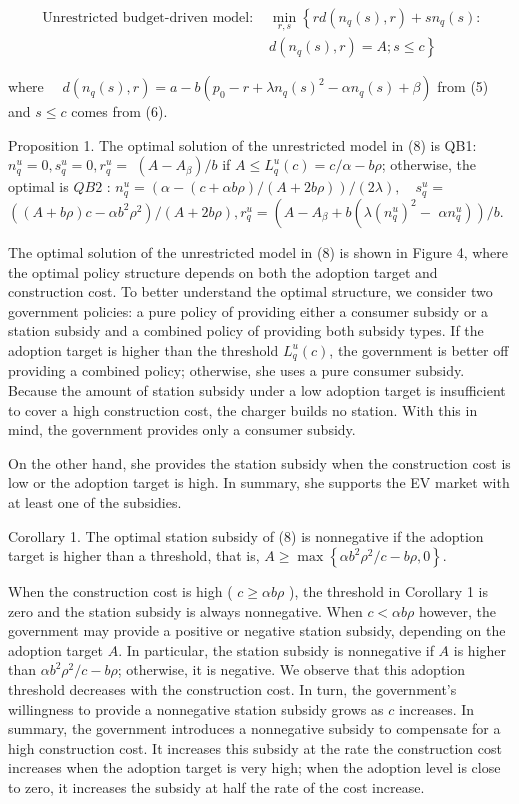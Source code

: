 \documentclass[10pt]{article}
\begin{document}
\begin{align*}
\text { Unrestricted budget-driven model: } & \min _{r, s}\left\{r d\left(n_{q}(s), r\right)+s n_{q}(s):\right. \\
& \left.d\left(n_{q}(s), r\right)=A ; s \leq c\right\} \tag{8}
\end{align*}


where $\quad d\left(n_{q}(s), r\right)=a-b\left(p_{0}-r+\lambda n_{q}(s)^{2}-\alpha n_{q}(s)+\beta\right)$ from (5) and $s \leq c$ comes from (6).

Proposition 1. The optimal solution of the unrestricted model in (8) is QB1: $n_{q}^{u}=0, s_{q}^{u}=0, r_{q}^{u}=$ $\left(A-A_{\beta}\right) / b$ if $A \leq L_{q}^{u}(c)=c / \alpha-b \rho$; otherwise, the optimal is $Q B 2$ : $n_{q}^{u}=(\alpha-(c+\alpha b \rho) /(A+2 b \rho)) /(2 \lambda), \quad s_{q}^{u}=$ $\left((A+b \rho) c-\alpha b^{2} \rho^{2}\right) /(A+2 b \rho), r_{q}^{u}=\left(A-A_{\beta}+b\left(\lambda\left(n_{q}^{u}\right)^{2}-\right.\right.$ $\left.\left.\alpha n_{q}^{u}\right)\right) / b$.

The optimal solution of the unrestricted model in (8) is shown in Figure 4, where the optimal policy structure depends on both the adoption target and construction cost. To better understand the optimal structure, we consider two government policies: a pure policy of providing either a consumer subsidy or a station subsidy and a combined policy of providing both subsidy types. If the adoption target is higher than the threshold $L_{q}^{u}(c)$, the government is better off providing a combined policy; otherwise, she uses a pure consumer subsidy. Because the amount of station subsidy under a low adoption target is insufficient to cover a high construction cost, the charger builds no station. With this in mind, the government provides only a consumer subsidy.

On the other hand, she provides the station subsidy when the construction cost is low or the adoption target is high. In summary, she supports the EV market with at least one of the subsidies.

Corollary 1. The optimal station subsidy of (8) is nonnegative if the adoption target is higher than a threshold, that is, $A \geq \max \left\{\alpha b^{2} \rho^{2} / c-b \rho, 0\right\}$.

When the construction cost is high ( $c \geq \alpha b \rho$ ), the threshold in Corollary 1 is zero and the station subsidy is always nonnegative. When $c<\alpha b \rho$ however, the government may provide a positive or negative station subsidy, depending on the adoption target $A$. In particular, the station subsidy is nonnegative if $A$ is higher than $\alpha b^{2} \rho^{2} / c-b \rho$; otherwise, it is negative. We observe that this adoption threshold decreases with the construction cost. In turn, the government's willingness to provide a nonnegative station subsidy grows as $c$ increases. In summary, the government introduces a nonnegative subsidy to compensate for a high construction cost. It increases this subsidy at the rate the construction cost increases when the adoption target is very high; when the adoption level is close to zero, it increases the subsidy at half the rate of the cost increase.
\end{document}
